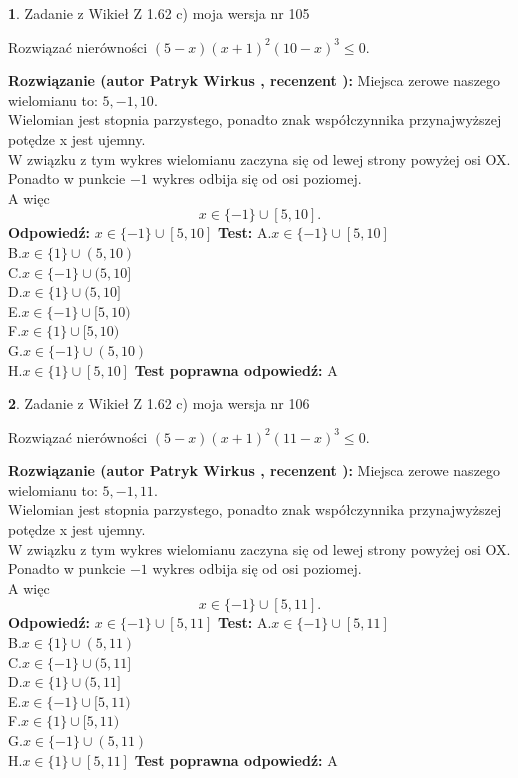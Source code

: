 \documentclass[12pt, a4paper]{article}
\theoremstyle{definition} %
\newtheorem{zad}{}
\newcommand{\zadStart}[1]{\begin{zad}#1\newline}
\newcommand{\zadStop}{\end{zad}}
\newcommand{\rozwStart}[2]{\noindent \textbf{Rozwiązanie (autor #1 , recenzent #2): }\newline}
\newcommand{\rozwStop}{\newline}
\newcommand{\odpStart}{\noindent \textbf{Odpowiedź:}\newline}
\newcommand{\odpStop}{\newline}
\newcommand{\testStart}{\noindent \textbf{Test:}\newline}
\newcommand{\testStop}{\newline}
\newcommand{\kluczStart}{\noindent \textbf{Test poprawna odpowiedź:}\newline}
\newcommand{\kluczStop}{\newline}
\begin{document}
\zadStart{Zadanie z Wikieł Z 1.62 c) moja wersja nr 105}

Rozwiązać nierówności $(5-x)(x+1)^{2}(10-x)^{3}\le0$.
\zadStop
\rozwStart{Patryk Wirkus}{}
Miejsca zerowe naszego wielomianu to: $5, -1, 10$.\\
Wielomian jest stopnia parzystego, ponadto znak współczynnika przy\linebreak najwyższej potędze x jest ujemny.\\ W związku z tym wykres wielomianu zaczyna się od lewej strony powyżej osi OX.\\
Ponadto w punkcie $-1$ wykres odbija się od osi poziomej.\\
A więc $$x \in \{-1\} \cup [5,10].$$
\rozwStop
\odpStart
$x \in \{-1\} \cup [5,10]$
\odpStop
\testStart
A.$x \in \{-1\} \cup [5,10]$\\
B.$x \in \{1\} \cup (5,10)$\\
C.$x \in \{-1\} \cup (5,10]$\\
D.$x \in \{1\} \cup (5,10]$\\
E.$x \in \{-1\} \cup [5,10)$\\
F.$x \in \{1\} \cup [5,10)$\\
G.$x \in \{-1\} \cup (5,10)$\\
H.$x \in \{1\} \cup [5,10]$
\testStop
\kluczStart
A
\kluczStop



\zadStart{Zadanie z Wikieł Z 1.62 c) moja wersja nr 106}

Rozwiązać nierówności $(5-x)(x+1)^{2}(11-x)^{3}\le0$.
\zadStop
\rozwStart{Patryk Wirkus}{}
Miejsca zerowe naszego wielomianu to: $5, -1, 11$.\\
Wielomian jest stopnia parzystego, ponadto znak współczynnika przy\linebreak najwyższej potędze x jest ujemny.\\ W związku z tym wykres wielomianu zaczyna się od lewej strony powyżej osi OX.\\
Ponadto w punkcie $-1$ wykres odbija się od osi poziomej.\\
A więc $$x \in \{-1\} \cup [5,11].$$
\rozwStop
\odpStart
$x \in \{-1\} \cup [5,11]$
\odpStop
\testStart
A.$x \in \{-1\} \cup [5,11]$\\
B.$x \in \{1\} \cup (5,11)$\\
C.$x \in \{-1\} \cup (5,11]$\\
D.$x \in \{1\} \cup (5,11]$\\
E.$x \in \{-1\} \cup [5,11)$\\
F.$x \in \{1\} \cup [5,11)$\\
G.$x \in \{-1\} \cup (5,11)$\\
H.$x \in \{1\} \cup [5,11]$
\testStop
\kluczStart
A
\kluczStop
\end{document}
